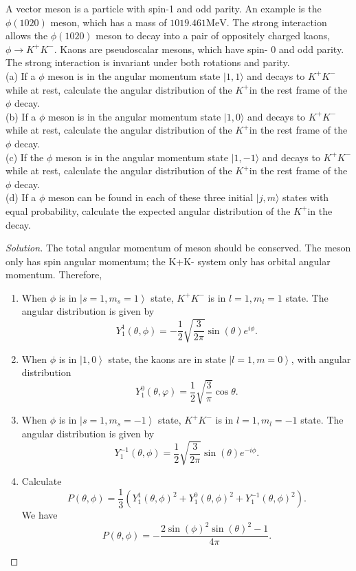 \begin{problem}
	A vector meson is a particle with spin-1 and odd parity. An example is the $\phi(1020)$ meson, which has a mass of $1019.461 \mathrm{MeV}$. The strong interaction allows the $\phi(1020)$ meson to decay into a pair of oppositely charged kaons, $\phi \rightarrow K^{+} K^{-}$. Kaons are pseudoscalar mesons, which have spin- 0 and odd parity. The strong interaction is invariant under both rotations and parity.\\
(a) If a $\phi$ meson is in the angular momentum state $|1,1\rangle$ and decays to $K^{+} K^{-}$while at rest, calculate the angular distribution of the $K^{+}$in the rest frame of the $\phi$ decay.\\
(b) If a $\phi$ meson is in the angular momentum state $|1,0\rangle$ and decays to $K^{+} K^{-}$while at rest, calculate the angular distribution of the $K^{+}$in the rest frame of the $\phi$ decay.\\
(c) If the $\phi$ meson is in the angular momentum state $|1,-1\rangle$ and decays to $K^{+} K^{-}$ while at rest, calculate the angular distribution of the $K^{+}$in the rest frame of the $\phi$ decay.\\
(d) If a $\phi$ meson can be found in each of these three initial $|j, m\rangle$ states with equal probability, calculate the expected angular distribution of the $K^{+}$in the decay.
\end{problem}
\begin{proof}[Solution]
	The total angular momentum of meson should be conserved. The meson only has spin angular momentum; the K+K- system only has orbital angular momentum. Therefore,
	\begin{enumerate}
		\item When $\phi$ is in $\left| s=1, m_s = 1 \right\rangle $ state, $K^+ K^-$ is in $l = 1, m_l = 1$ state. The angular distribution is given by
			\[
				Y_1^1 (\theta, \phi) = -\frac{1}{2} \sqrt{\frac{3}{2 \pi}} \sin(\theta) e^{i \phi}
			.\] 
		\item When $\phi$ is in $\left| 1, 0 \right\rangle $ state, the kaons are in state $\left| l = 1, m = 0 \right\rangle $, with angular distribution
			\[
				Y_1^0(\theta, \varphi)=\frac{1}{2} \sqrt{\frac{3}{\pi}} \cos \theta
			.\] 
		\item When $\phi$ is in $\left| s=1, m_s = -1 \right\rangle $ state, $K^+ K^-$ is in $l = 1, m_l = -1$ state. The angular distribution is given by
			\[
				Y_1^{-1} (\theta, \phi) = \frac{1}{2} \sqrt{\frac{3}{2 \pi}} \sin(\theta) e^{-i \phi}
			.\]
		\item Calculate
			\[
				P (\theta, \phi) = \frac{1}{3}\left( Y_1^1(\theta, \phi)^2 + Y_1^0 (\theta, \phi)^2 + Y_1^{-1}(\theta, \phi)^2 \right) 
			.\] 
		We have
		\[
			P\left( \theta, \phi \right) =
			-\frac{2 \sin (\phi)^2 \sin (\theta)^2-1}{4 \pi}
		.\] 
	\end{enumerate}
\end{proof}



